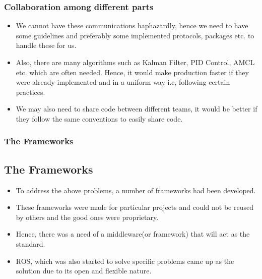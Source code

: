 \documentclass{beamer}
\begin{document}



	\begin{frame}
		\frametitle{Collaboration among different parts}
		
		\begin{itemize}
			\item We cannot have these communications haphazardly, hence we need to have some guidelines and preferably some implemented protocols, packages etc. to handle these for us.\medskip
			\item Also, there are many algorithms such as Kalman Filter, PID Control, AMCL etc. which are often needed. Hence, it would make production faster if they were already implemented and in a uniform way i.e, following certain practices.\medskip
			\item We may also need to share code between different teams, it would be better if they follow the same conventions to easily share code.\medskip
		\end{itemize}

	\end{frame}




	\begin{frame}
		
		\frametitle{The Frameworks}
		\subsection{The Frameworks}
		
		\begin{itemize}
			\item To address the above problems, a number of frameworks had been developed.\cite{kramer2007development}\medskip
			\item These frameworks were made for particular projects and could not be reused by others and the good ones were proprietary.\medskip
			\item Hence, there was a need of a middleware(or framework) that will act as the standard.\medskip
			\item ROS, which was also started to solve specific problems came up as the solution due to its open and flexible nature.\medskip
		\end{itemize}

	\end{frame}
\end{document}
